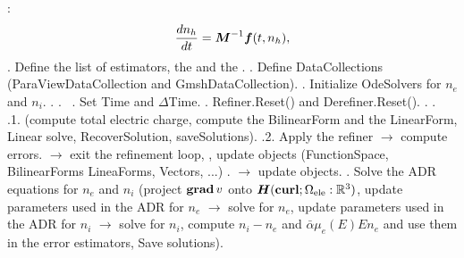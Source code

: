 \documentclass[review,hidelinks,onefignum,onetabnum]{siamart220329}
\begin{document}
{\begin{center}
\begin{algorithm}
\begin{algorithmic}
            :
            \begin{equation*}
              \frac{d n_h}{d t} = \boldsymbol{M}^{-1} \mbox{\boldmath$f$}(t, n_h),
            \end{equation*}
            \vspace{2mm}
            . Define the list of estimators, the  and the .
            \vspace{2mm}
            . Define DataCollections (ParaViewDataCollection and GmshDataCollection).
            \vspace{2mm}
            . Initialize OdeSolvers for $n_e$ and $n_i$.
            \vspace{2mm}
            . .
            \vspace{2mm}
                          \, 
              . Set Time and $\Delta$Time.
              \vspace{1mm}
              . Refiner.Reset() and Derefiner.Reset().
              \vspace{1mm}
              . .
              \vspace{1mm}
               \, 
                .1.  (compute total electric charge, compute the BilinearForm and the LinearForm, Linear solve, RecoverSolution, saveSolutions).          
              \vspace{1mm}
                .2. Apply the refiner $\longrightarrow$ compute errors.  $\longrightarrow$ exit the refinement loop, , update objects (FunctionSpace, BilinearForms LineaForms, Vectors, ...)
              \EndFor
              .  $\longrightarrow$ update objects.
              \vspace{1mm}
              . Solve the ADR equations for $n_e$ and $n_i$ (project $\Grad[]{v}$ onto $\Hcurl[]{\Omega_{\mathrm{ele}}:\mathbb{R}^3}$, update parameters used in the ADR for $n_e$ $\longrightarrow$ solve for $n_e$, update parameters used in the ADR for $n_i$ $\longrightarrow$ solve for $n_i$, compute $n_i - n_e$ and $\bar{\alpha} \mu_e(E) E n_e$ and use them in the error estimators, Save solutions).
            \EndFor
        \EndProcedure
      \end{algorithmic}
    \end{algorithm}
  \end{center}
}
%
\normalsize
%
%
 
% 
\end{document}
